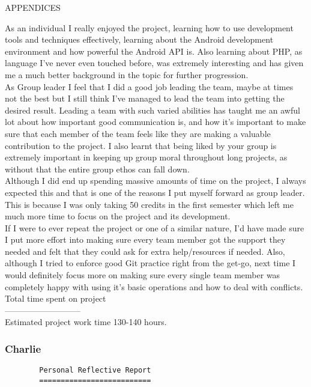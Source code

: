 \documentclass{article}
\begin{document}
\begin{section}{APPENDICES}
\begin{tt}
				As an individual I really enjoyed the project, learning how to use development tools and techniques effectively, learning about the Android development environment and how powerful the Android API is. Also learning about PHP, as language I’ve never even touched before, was extremely interesting and has given me a much better background in the topic for further progression. \\
				As Group leader I feel that I did a good job leading the team, maybe at times not the best but I still think I've managed to lead the team into getting the desired result. Leading a team with such varied abilities has taught me an awful lot about how important good communication is, and how it's important to make sure that each member of the team feels like they are making a valuable contribution to the project. I also learnt that being liked by your group is extremely important in keeping up group moral throughout long projects, as without that the entire group ethos can fall down. \\

				Although I did end up spending massive amounts of time on the project, I always expected this and that is one of the reasons I put myself forward as group leader. This is because I was only taking 50 credits in the first semester which left me much more time to focus on the project and its development. \\

				If I were to ever repeat the project or one of a similar nature, I'd have made sure I put more effort into making sure every team member got the support they needed and felt that they could ask for extra help/resources if needed. Also, although I tried to enforce good Git practice right from the get-go, next time I would definitely focus more on making sure every single team member was completely happy with using it's basic operations and how to deal with conflicts. \\

				Total time spent on project \\
				--------------------------- \\
				Estimated project work time 130-140 hours. \\
				\end{tt}
		
		\clearpage	
		\subsubsection{Charlie}
		\begin{verbatim}
		Personal Reflective Report
		==========================


\end{verbatim}
\end{section}
\end{document}

